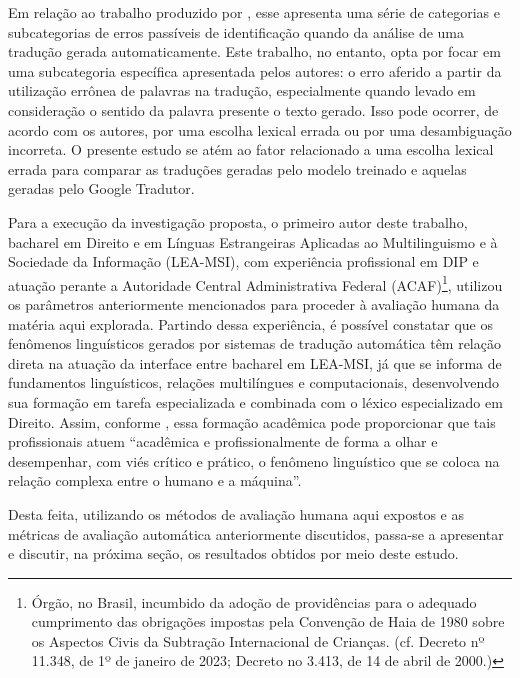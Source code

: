 \documentclass[portuguese]{textolivre}
\begin{document}
Em relação ao trabalho produzido por \textcite{vilar_error_2006}, esse apresenta uma série de categorias e subcategorias de erros passíveis de identificação quando da análise de uma tradução gerada automaticamente. Este trabalho, no entanto, opta por focar em uma subcategoria específica apresentada pelos autores: o erro aferido a partir da utilização errônea de palavras na tradução, especialmente quando levado em consideração o sentido da palavra presente o texto gerado. Isso pode ocorrer, de acordo com os autores, por uma escolha lexical errada ou por uma desambiguação incorreta. O presente estudo se atém ao fator relacionado a uma escolha lexical errada para comparar as traduções geradas pelo modelo treinado e aquelas geradas pelo Google Tradutor.
 
Para a execução da investigação proposta, o primeiro autor deste trabalho, bacharel em Direito e em Línguas Estrangeiras Aplicadas ao Multilinguismo e à Sociedade da Informação (LEA-MSI), com experiência profissional em DIP e atuação perante a Autoridade Central Administrativa Federal (ACAF)\footnote{Órgão, no Brasil, incumbido da adoção de providências para o adequado cumprimento das obrigações impostas pela Convenção de Haia de 1980 sobre os Aspectos Civis da Subtração Internacional de Crianças. (cf. Decreto nº 11.348, de 1º de janeiro de 2023; Decreto no 3.413, de 14 de abril de 2000.)}, utilizou os parâmetros anteriormente mencionados para proceder à avaliação humana da matéria aqui explorada. Partindo dessa experiência, é possível constatar que os fenômenos linguísticos gerados por sistemas de tradução automática têm relação direta na atuação da interface entre bacharel em LEA-MSI, já que se informa de fundamentos linguísticos, relações multilíngues e computacionais, desenvolvendo sua formação em tarefa especializada e combinada com o léxico especializado em Direito. Assim, conforme \textcite[p. 73]{pires_avaliacao_2020}, essa formação acadêmica pode proporcionar que tais profissionais atuem “acadêmica e profissionalmente de forma a olhar e desempenhar, com viés crítico e prático, o fenômeno linguístico que se coloca na relação complexa entre o humano e a máquina”.

Desta feita, utilizando os métodos de avaliação humana aqui expostos e as métricas de avaliação automática anteriormente discutidos, passa-se a apresentar e discutir, na próxima seção, os resultados obtidos por meio deste estudo.
\end{document}
